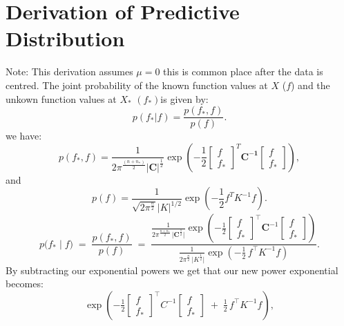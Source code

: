 \documentclass{ucdgradtaughtthesis}
\begin{document}
\section{Derivation of Predictive Distribution}
\label{appendix:predictive-dist}
Note: This derivation assumes \(\mu = 0\) this is common place after the data is centred.
The joint probability of the known function values at \(X\) (\(f\)) and the unkown function values at \(X_*\) \((f_*)\)is given by:
\begin{equation}
\label{eq:bayesrule}
p(f_* | f) = \frac{p(f_*, f)}{p(f)}.
\end{equation}
we have:
\begin{equation}
p(f_*,f) = \frac{1}{2\pi^{\frac{(n+n_*)}{2}}{\mathbf{|C|}}^{\frac{1}{2}}}\exp \left(-\frac{1}{2} 
\begin{bmatrix} f \\ f_*  \end{bmatrix}^T\mathbf{C^{-1}}\begin{bmatrix} f  \\ f_* \end{bmatrix}\right),
\end{equation}
and 
\begin{equation}
p(f) = \frac{1}{\sqrt{2\pi^{\frac{n}{2}}} |K|^{1/2}}
\exp \left(-\frac{1}{2} f^T K^{-1} f \right).
\end{equation}
\begin{equation}
p\bigl(f_* \mid f\bigr)
\;=\;
\frac{p(f_*, f)}{p(f)}
\;=\;
\frac{\displaystyle
  \frac{1}{2\pi^{\frac{n+n_*}{2}}\,\lvert \mathbf{C}^\frac{1}{2}\rvert}
  \exp\!\left(-\tfrac{1}{2}
    \begin{bmatrix} f \\[4pt] f_* \end{bmatrix}^{\!\top}
    \mathbf{C}^{-1}
    \begin{bmatrix} f \\[4pt] f_* \end{bmatrix}
  \right)
}{\displaystyle
  \frac{1}{2\pi^{\frac{n}{2}}\,\lvert K^{\frac{1}{2}}\rvert}
  \exp \left(-\tfrac{1}{2}\,f^{\!\top}K^{-1}f\right)
}.
\end{equation}
By subtracting our exponential powers we get that our new power exponential becomes:
\begin{equation}
     \exp\left(-\tfrac12
    \begin{bmatrix} f \\ f_* \end{bmatrix}^{\top}
    C^{-1}
    \begin{bmatrix} f \\ f_* \end{bmatrix}
    \;+\;
    \tfrac12\,f^{\top}K^{-1}f \right),
\end{equation}
\end{document}
